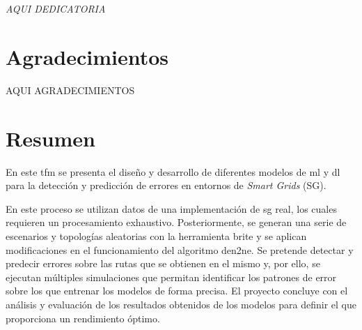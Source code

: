 

\cleardoublepage %
\chapter*{}
\setlength{\leftmargin}{0.5\textwidth}
\setlength{\parsep}{0cm}
\addtolength{\topsep}{0.5cm}
\begin{flushright}
	\small\em{
		AQUI DEDICATORIA
	}
\end{flushright}

 


\chapter*{Agradecimientos}

\thispagestyle{empty}
\vspace{1cm}

AQUI AGRADECIMIENTOS

\cleardoublepage %



\chapter{Resumen}
\thispagestyle{empty}
En este \gls{tfm} se presenta el diseño y desarrollo de diferentes modelos de \gls{ml} y \gls{dl} para la detección y predicción de errores en entornos de \textit{Smart Grids} (SG).

\vspace{3mm}

En este proceso se utilizan datos de una implementación de \gls{sg} real, los cuales requieren un procesamiento exhaustivo. Posteriormente, se generan una serie de escenarios y topologías aleatorias con la herramienta \acrshort{brite} y se aplican modificaciones en el funcionamiento del algoritmo \acrshort{den2ne}. Se pretende detectar y predecir errores sobre las rutas que se obtienen en el mismo y, por ello, se ejecutan múltiples simulaciones que permitan identificar los patrones de error sobre los que entrenar los modelos de forma precisa. El proyecto concluye con el análisis y evaluación de los resultados obtenidos de los modelos para definir el que proporciona un rendimiento óptimo.

